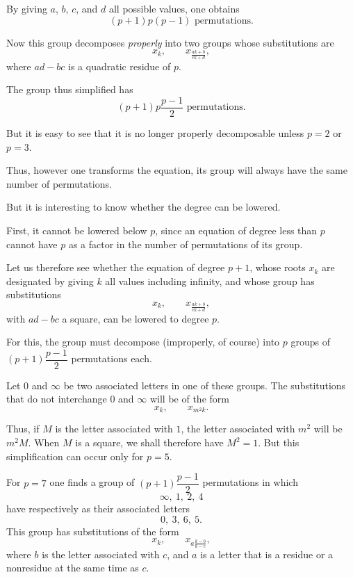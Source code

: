 By giving $a$, $b$, $c$, and $d$ all possible values, one obtains
\[
(p+1)p(p-1)\text{ permutations.}
\]

Now this group decomposes \emph{properly} into two groups whose
substitutions are
\[
x_k,\qquad x_{\frac{ak+b}{ck+d}},
\]
where $ad-bc$ is a quadratic residue of $p$.

The group thus simplified has
\[
(p+1)p\frac{p-1}{2}\text{ permutations.}
\]

But it is easy to see that it is no longer properly decomposable unless
$p=2$ or $p=3$.

Thus, however one transforms the equation, its group will always have
the same number of permutations.

But it is interesting to know whether the degree can be lowered.

First, it cannot be lowered below $p$, since an equation of degree less
than $p$ cannot have $p$ as a factor in the number of permutations of
its group.

Let us therefore see whether the equation of degree $p+1$, whose roots
$x_k$ are designated by giving $k$ all values including infinity, and
whose group has substitutions
\[
x_k,\qquad x_{\frac{ak+b}{ck+d}},
\]
with $ad-bc$ a square, can be lowered to degree $p$.

For this, the group must decompose (improperly, of course) into $p$
groups of $(p+1)\dfrac{p-1}{2}$ permutations each.


Let $0$ and $\infty$ be two associated letters in one of these groups.
The substitutions that do not interchange $0$ and $\infty$ will be of
the form
\[
x_k,\qquad x_{m^2k}.
\]

Thus, if $M$ is the letter associated with $1$, the letter associated
with $m^2$ will be $m^2M$. When $M$ is a square, we shall therefore have
$M^2=1$. But this simplification can occur only for $p=5$.

For $p=7$ one finds a group of $(p+1)\dfrac{p-1}{2}$ permutations in
which
\[
\infty,\ 1,\ 2,\ 4
\]
have respectively as their associated letters
\[
0,\ 3,\ 6,\ 5.
\]
This group has substitutions of the form
\[
x_k,\qquad x_{a\frac{k-b}{k-c}},
\]
where $b$ is the letter associated with $c$, and $a$ is a letter that is
a residue or a nonresidue at the same time as $c$.

